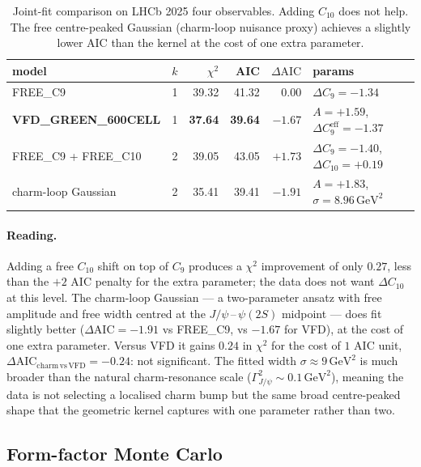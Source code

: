 \begin{table}[h]
\centering
\small
\setlength{\tabcolsep}{4pt}
\begin{tabular}{lcrrrl}
\toprule
model & $k$ & $\chi^{2}$ & AIC & $\Delta\mathrm{AIC}$ & params \\
\midrule
FREE\_C9                       & 1 & 39.32 & 41.32 & $0.00$  & $\Delta C_{9}=-1.34$ \\
\textbf{VFD\_GREEN\_600CELL}   & 1 & \textbf{37.64} & \textbf{39.64} & $\boldsymbol{-1.67}$ & $A=+1.59$, $\Delta C_{9}^{\mathrm{eff}}=-1.37$ \\
FREE\_C9 + FREE\_C10           & 2 & 39.05 & 43.05 & $+1.73$ & $\Delta C_{9}=-1.40$, $\Delta C_{10}=+0.19$ \\
charm-loop Gaussian            & 2 & 35.41 & 39.41 & $-1.91$ & $A=+1.83$, $\sigma=8.96\,\mathrm{GeV}^{2}$ \\
\bottomrule
\end{tabular}
\caption{Joint-fit comparison on LHCb 2025 four observables.
Adding $C_{10}$ does not help. The free centre-peaked Gaussian
(charm-loop nuisance proxy) achieves a slightly lower AIC than the
kernel at the cost of one extra parameter.}
\label{tab:alts}
\end{table}

\paragraph{Reading.} Adding a free $C_{10}$ shift on top of $C_{9}$
produces a $\chi^{2}$ improvement of only $0.27$, less than the
$+2$ AIC penalty for the extra parameter; the data does not want
$\Delta C_{10}$ at this level. The charm-loop Gaussian — a
two-parameter ansatz with free amplitude and free width centred at
the $J/\psi$\,--\,$\psi(2S)$ midpoint — does fit slightly better
($\Delta\mathrm{AIC}=-1.91$ vs FREE\_C9, vs $-1.67$ for VFD), at the
cost of one extra parameter. Versus VFD it gains $0.24$ in $\chi^{2}$
for the cost of $1$ AIC unit, $\Delta\mathrm{AIC}_{\mathrm{charm\,vs\,VFD}}=-0.24$:
not significant. The fitted width $\sigma\approx 9\,\mathrm{GeV}^{2}$ is
much broader than the natural charm-resonance scale ($\Gamma_{J/\psi}^{2}
\sim 0.1\,\mathrm{GeV}^{2}$), meaning the data is not selecting a
localised charm bump but the same broad centre-peaked shape that the
geometric kernel captures with one parameter rather than two.

\subsection{Form-factor Monte Carlo}

